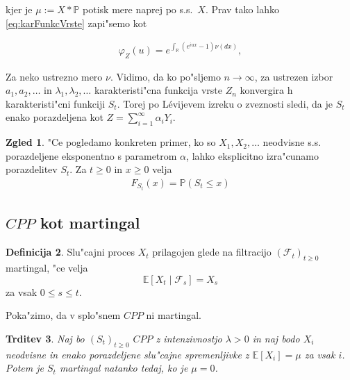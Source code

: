 \documentclass[12pt, a4paper, reqno]{amsart}
\theoremstyle{definition} %
\newtheorem{definicija}{Definicija}[section]
\newtheorem{zgled}[definicija]{Zgled}
\theoremstyle{plain} %
\newtheorem{trditev}[definicija]{Trditev}
\newcommand{\R}{\mathbb{R}}
\newcommand{\E}{\mathbb{E}}
\newcommand{\F}{\mathcal{F}}
\newcommand{\Prob}{\mathbb{P}}
\newcommand{\1}{\mathds{1}}
\begin{document}
    \noindent
    kjer je $\mu := X*\Prob$ potisk mere naprej po s.s.\ $X$. Prav tako lahko \ref{eq:karFunkcVrste} zapi"semo
    kot 

    \begin{align*}
        \varphi_{Z}(u) = e^{\int_{\R}\left(e^{i u x} - 1\right)\nu(dx)},
    \end{align*}

    \noindent
    Za neko ustrezno mero $\nu$. Vidimo, da ko po"sljemo $n\to \infty$, za ustrezen izbor 
    $a_1, a_2, \dots$ in $\lambda_1, \lambda_2, \dots$ karakteristi"cna funkcija 
    vrste $Z_n$ konvergira h karakteristi"cni funkciji $S_t$. Torej po Lévijevem izreku o zveznosti 
    sledi, da je $S_t$ enako porazdeljena kot $Z = \sum_{i=1}^{\infty}\alpha_iY_i$.

    \begin{zgled}
        "Ce pogledamo konkreten primer, ko so $X_1, X_2, \dots$ neodvisne s.s. porazdeljene eksponentno 
        s parametrom $\alpha$, lahko eksplicitno izra"cunamo porazdelitev $S_t$. Za $t\geq 0$
        in $x \geq 0$ velja
        \begin{align*}
            F_{S_t}(x) = \Prob(S_t \leq x)
        \end{align*}
    \end{zgled}




    \subsection{$CPP$ kot martingal}

        \begin{definicija}
            Slu"cajni proces $X_t$ prilagojen glede na filtracijo $(\F_t)_{t\geq0}$
            martingal, "ce velja 
            $$
                \E\left[X_t\mid\F_s\right] = X_s
            $$
            za vsak $0\leq s \leq t$.
            \label{def:martingal}
        \end{definicija}

        Poka"zimo, da v splo"snem $CPP$ ni martingal.

        \begin{trditev}
            Naj bo $(S_t)_{t\geq0}$ $CPP$ z intenzivnostjo $\lambda>0$ in naj bodo $X_i$ neodvisne
            in enako porazdeljene slu"cajne spremenljivke z $\E\left[X_i\right] = \mu$ za vsak $i$.
            Potem je $S_t$ martingal natanko tedaj, ko je $\mu = 0$.
            \label{trd:CPPnimartingal}
        \end{trditev}
\end{document}
